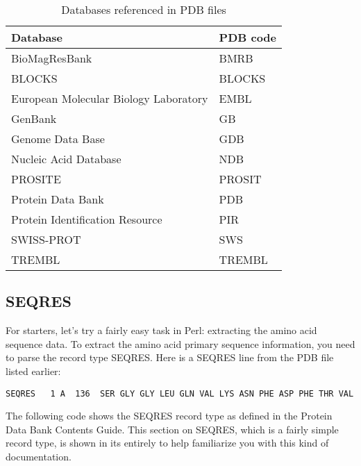 \begin{table}[!htbp]
  \begin{center}
  \caption{Databases referenced in PDB files}
  \label{tab:table11.1}
  \begin{tabu} to 0.6\linewidth {X[3,l]X[1,l]}
  \toprule
  Database & PDB code\\
  \midrule
  BioMagResBank & BMRB \\
  BLOCKS & BLOCKS\\
  European Molecular Biology Laboratory & EMBL\\
  GenBank & GB\\
  Genome Data Base & GDB\\
  Nucleic Acid Database & NDB\\
  PROSITE & PROSIT\\
  Protein Data Bank & PDB\\
  Protein Identification Resource & PIR\\
  SWISS-PROT & SWS\\
  TREMBL & TREMBL\\
  \bottomrule
  \end{tabu}
  \end{center}
\end{table}

\subsection{SEQRES}
For starters, let's try a fairly easy task in Perl: extracting the amino acid sequence data. To extract the amino acid primary sequence information, you need to parse the record type SEQRES. Here is a SEQRES line from the PDB file listed earlier: 

\begin{lstlisting}
SEQRES   1 A  136  SER GLY GLY LEU GLN VAL LYS ASN PHE ASP PHE THR VAL
\end{lstlisting}

The following code shows the SEQRES record type as defined in the Protein Data Bank Contents Guide. This section on SEQRES, which is a fairly simple record type, is shown in its entirely to help familiarize you with this kind of documentation. 

